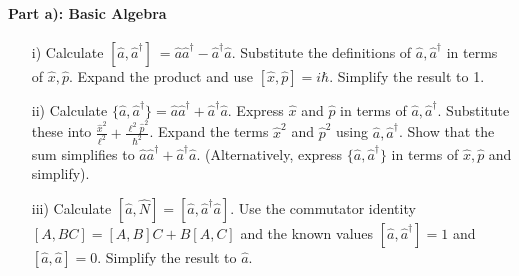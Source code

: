 \documentclass[10pt]{article}
\begin{document}
\paragraph{Part a): Basic Algebra}
\begin{enumerate}
    \item[i)] Calculate \([\hat{a}, \hat{a}^\dagger]\ = \hat{a}\hat{a}^\dagger - \hat{a}^\dagger\hat{a}\). Substitute the definitions of \(\hat{a}, \hat{a}^\dagger\) in terms of \(\hat{x}, \hat{p}\). Expand the product and use \([\hat{x}, \hat{p}]=i\hbar\). Simplify the result to 1.
    \item[ii)] Calculate \(\{\hat{a}, \hat{a}^\dagger\} = \hat{a}\hat{a}^\dagger + \hat{a}^\dagger\hat{a}\). Express \(\hat{x}\) and \(\hat{p}\) in terms of \(\hat{a}, \hat{a}^\dagger\). Substitute these into \(\frac{\hat{x}^2}{\ell^2} + \frac{\ell^2 \hat{p}^2}{\hbar^2}\). Expand the terms \(\hat{x}^2\) and \(\hat{p}^2\) using \(\hat{a}, \hat{a}^\dagger\). Show that the sum simplifies to \(\hat{a}\hat{a}^\dagger + \hat{a}^\dagger\hat{a}\). (Alternatively, express \(\{\hat{a}, \hat{a}^\dagger\}\) in terms of \(\hat{x}, \hat{p}\) and simplify).
    \item[iii)] Calculate \([\hat{a}, \hat{N}] = [\hat{a}, \hat{a}^\dagger \hat{a}]\). Use the commutator identity \([A, BC]=[A,B]C + B[A,C]\) and the known values \([\hat{a}, \hat{a}^\dagger]=1\) and \([\hat{a}, \hat{a}]=0\). Simplify the result to \(\hat{a}\).
\end{enumerate}
\end{document}
